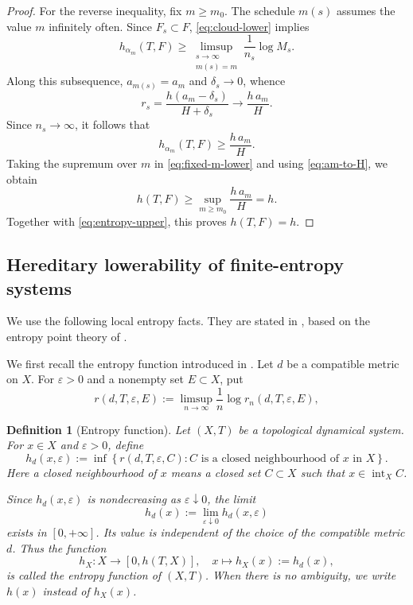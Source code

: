 \documentclass[10pt,a4paper]{amsart}
\newtheorem{definition}[theorem]{Definition}
\numberwithin{equation}{section}
\begin{document}
\begin{proof}
		For the reverse inequality, fix $m\geq m_0$.  The schedule $m(s)$ assumes
		the value $m$ infinitely often.  Since $F_s\subset F$, \eqref{eq:cloud-lower} implies
		\[
		h_{\alpha_m}(T,F)
		\geq
		\limsup_{\substack{s\to\infty\\m(s)=m}}
		\frac1{n_s}\log M_s.
		\]
		Along this subsequence, $a_{m(s)}=a_m$ and $\delta_s\to0$, whence
		\[
			r_s
			=
			\frac{h(a_m-\delta_s)}{H+\delta_s}
			\longrightarrow
			\frac{h\,a_m}{H}.
		\]
		Since $n_s\to\infty$, it follows that
		\begin{equation}
			h_{\alpha_m}(T,F)
			\geq
			\frac{h\,a_m}{H}.
			\label{eq:fixed-m-lower}
		\end{equation}
		Taking the supremum over $m$ in \eqref{eq:fixed-m-lower} and using
		\eqref{eq:am-to-H}, we obtain
		\[
		h(T,F)
		\geq
		\sup_{m\geq m_0}\frac{h\,a_m}{H}
		=h.
		\]
		Together with \eqref{eq:entropy-upper}, this proves $h(T,F)=h$.
	\end{proof}
	
	\subsection{Hereditary lowerability of finite-entropy systems}
	\label{sec:finite-systems}
	We use the following local entropy facts. They are stated in
	\cite[Theorem~5.1]{HYZ2010}, based on the entropy point theory of \cite{YeZhang2007}. 
	
	We first recall the entropy function introduced in
	\cite[Definition~4.1]{YeZhang2007}. Let $d$ be a compatible metric on $X$.
	For $\varepsilon>0$ and a nonempty set $E\subset X$, put
	\[
	r(d,T,\varepsilon,E)
	:=
	\limsup_{n\to\infty}
	\frac{1}{n}
	\log r_n(d,T,\varepsilon,E),
	\]
	\begin{definition}[Entropy function]
		\label{def:entropy-function}
		Let $(X,T)$ be a topological dynamical system. For $x\in X$ and
		$\varepsilon>0$, define
		\[
		h_d(x,\varepsilon)
		:=
		\inf
		\left\{
		r(d,T,\varepsilon,C):
		C\text{ is a closed neighbourhood of }x\text{ in }X
		\right\}.
		\]
		Here a closed neighbourhood of $x$ means a closed set $C\subset X$
		such that $x\in\operatorname{int}_X C$.
		
		Since $h_d(x,\varepsilon)$ is nondecreasing as
		$\varepsilon\downarrow0$, the limit
		\[
		h_d(x)
		:=
		\lim_{\varepsilon\downarrow0}h_d(x,\varepsilon)
		\]
		exists in $[0,+\infty]$. Its value is independent of the choice of the
		compatible metric $d$. Thus the function
		\[
		h_X\colon X\longrightarrow[0,h(T,X)],
		\quad
		x\longmapsto h_X(x):=h_d(x),
		\]
		is called the entropy function of $(X,T)$. When there is no ambiguity,
		we write $h(x)$ instead of $h_X(x)$.
	\end{definition}
	
\end{document}
